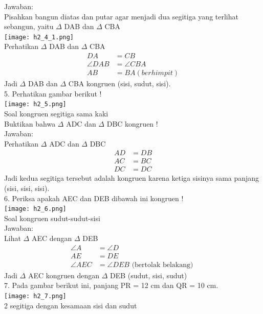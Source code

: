 \documentclass[11pt,fleqn]{book} %
\begin{document}
Jawaban:\\
Pisahkan bangun diatas dan putar agar menjadi dua segitiga yang terlihat sebangun, yaitu $\Delta$ DAB dan $\Delta$ CBA\\
\texttt{[image: h2\_4\_1.png]}\\

Perhatikan $\Delta$ DAB dan $\Delta$ CBA\\
    \begin{align*} DA &= CB \\ \angle DAB &= \angle CBA \\ AB &= BA (berhimpit) \end{align*}
Jadi $\Delta$ DAB dan $\Delta$ CBA kongruen (sisi, sudut, sisi).\\


5. Perhatikan gambar berikut !\\
\texttt{[image: h2\_5.png]}\\
Soal kongruen segitiga sama kaki\\
Buktikan bahwa $\Delta$ ADC dan $\Delta$ DBC kongruen !\\

Jawaban:\\
Perhatikan $\Delta$ ADC dan $\Delta$ DBC\\
    \begin{align*} AD &= DB \\ AC &= BC \\ DC &= DC \end{align*}
Jadi kedua segitiga tersebut adalah kongruen karena ketiga sisinya sama panjang (sisi, sisi, sisi).\\


6. Periksa apakah  AEC dan  DEB dibawah ini kongruen !\\
\texttt{[image: h2\_6.png]}\\
Soal kongruen sudut-sudut-sisi\\

Jawaban:\\
Lihat $\Delta$ AEC dengan $\Delta$ DEB\\
    \begin{align*} \angle A &= \angle D \\ AE &= DE \\ \angle AEC &= \angle DEB \text{ (bertolak belakang) } \end{align*}
Jadi $\Delta$ AEC kongruen dengan $\Delta$ DEB (sudut, sisi, sudut)\\


7. Pada gambar berikut ini, panjang PR = 12 cm dan QR = 10 cm.\\
\texttt{[image: h2\_7.png]}\\
2 segitiga dengan kesamaan sisi dan sudut\\
\end{document}
